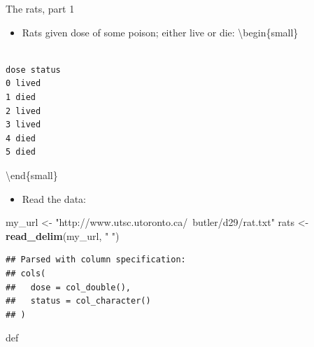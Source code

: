 \documentclass[ignorenonframetext,]{beamer}
\newenvironment{Shaded}{\begin{snugshade}}{\end{snugshade}}
\newcommand{\KeywordTok}[1]{\textcolor[rgb]{0.13,0.29,0.53}{\textbf{#1}}}
\newcommand{\NormalTok}[1]{#1}
\newcommand{\StringTok}[1]{\textcolor[rgb]{0.31,0.60,0.02}{#1}}
\providecommand{\tightlist}{%
  \setlength{\itemsep}{0pt}\setlength{\parskip}{0pt}}
\begin{document}
\begin{frame}[fragile]{The rats, part 1}
\protect\hypertarget{the-rats-part-1}{}

\begin{itemize}
\tightlist
\item
  Rats given dose of some poison; either live or die:
  \textbackslash{}begin\{small\}
\end{itemize}

\begin{verbatim}

dose status
0 lived
1 died
2 lived
3 lived
4 died
5 died
\end{verbatim}

\textbackslash{}end\{small\}

\begin{itemize}
\tightlist
\item
  Read the data:
\end{itemize}

\begin{Shaded}
\begin{Highlighting}[]
\NormalTok{my_url <-}\StringTok{ "http://www.utsc.utoronto.ca/~butler/d29/rat.txt"}
\NormalTok{rats <-}\StringTok{ }\KeywordTok{read_delim}\NormalTok{(my_url, }\StringTok{" "}\NormalTok{)}
\end{Highlighting}
\end{Shaded}

\begin{verbatim}
## Parsed with column specification:
## cols(
##   dose = col_double(),
##   status = col_character()
## )
\end{verbatim}

def

\end{frame}
\end{document}
